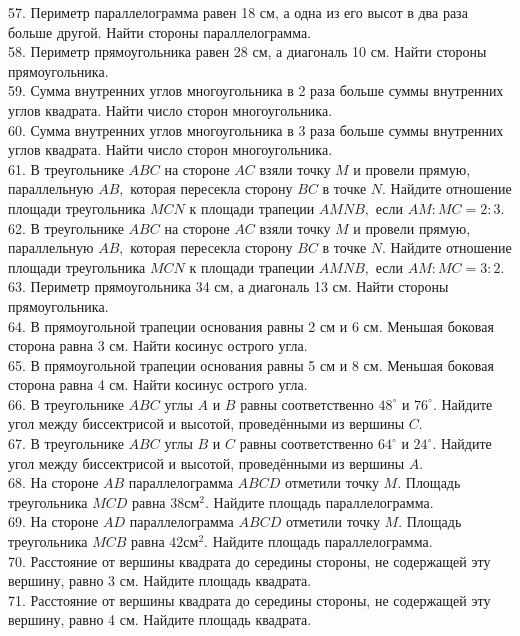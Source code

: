 57. Периметр параллелограмма равен 18 см, а одна из его высот в два раза больше другой. Найти стороны параллелограмма.\\
58. Периметр прямоугольника равен 28 см, а диагональ 10 см. Найти стороны прямоугольника.\\
59. Сумма внутренних углов многоугольника в 2 раза больше суммы внутренних углов квадрата. Найти число сторон многоугольника.\\
60. Сумма внутренних углов многоугольника в 3 раза больше суммы внутренних углов квадрата. Найти число сторон многоугольника.\\
61. В треугольнике $ABC$ на стороне $AC$ взяли точку $M$ и провели прямую, параллельную $AB,$ которая пересекла сторону $BC$ в точке $N.$ Найдите отношение площади треугольника $MCN$ к площади трапеции $AMNB,$ если $AM:MC=2:3.$\\
62. В треугольнике $ABC$ на стороне $AC$ взяли точку $M$ и провели прямую, параллельную $AB,$ которая пересекла сторону $BC$ в точке $N.$ Найдите отношение площади треугольника $MCN$ к площади трапеции $AMNB,$ если $AM:MC=3:2.$\\
63. Периметр прямоугольника 34 см, а диагональ 13 см. Найти стороны прямоугольника.\\
64. В прямоугольной трапеции основания равны 2 см и 6 см. Меньшая боковая сторона равна 3 см. Найти косинус острого угла.\\
65. В прямоугольной трапеции основания равны 5 см и 8 см. Меньшая боковая сторона равна 4 см. Найти косинус острого угла.\\
66. В треугольнике $ABC$ углы $A$ и $B$ равны соответственно $48^\circ$ и $76^\circ.$ Найдите угол между биссектрисой и высотой, проведёнными из вершины $C.$\\
67. В треугольнике $ABC$ углы $B$ и $C$ равны соответственно $64^\circ$ и $24^\circ.$ Найдите угол между биссектрисой и высотой, проведёнными из вершины $A.$\\
68. На стороне $AB$ параллелограмма $ABCD$ отметили точку $M.$ Площадь треугольника $MCD$ равна $38\text{см}^2.$ Найдите площадь параллелограмма.\\
69. На стороне $AD$ параллелограмма $ABCD$ отметили точку $M.$ Площадь треугольника $MCB$ равна $42\text{см}^2.$ Найдите площадь параллелограмма.\\
70. Расстояние от вершины квадрата до середины стороны, не содержащей эту вершину, равно 3 см. Найдите площадь квадрата.\\
71. Расстояние от вершины квадрата до середины стороны, не содержащей эту вершину, равно 4 см. Найдите площадь квадрата.\\
